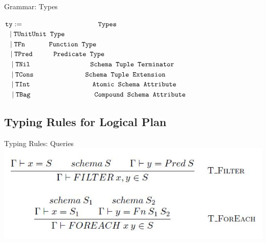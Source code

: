 \begin{frame}{Grammar: Types}
\centering
	\begin{flushleft}
	$ \texttt{ty} := \qquad\qquad\qquad\qquad\quad\quad\:\: \texttt{Types}\hfill$\\
	$ \:\:\: \mid \texttt{TUnit}\hfill \texttt{Unit Type}\hfill$\\
   	$ \:\:\: \mid \texttt{TFn} \hfill\qquad\quad\:\: \texttt{Function Type}\hfill$\\
    $ \:\:\: \mid \texttt{TPred} \hfill\qquad\quad \texttt{Predicate Type}\hfill$\\
    $ \:\:\: \mid \texttt{TNil} \hfill \qquad\qquad\qquad\qquad\:\:\: \texttt{Schema Tuple Terminator}\hfill$\\
    $ \:\:\: \mid \texttt{TCons} \hfill \qquad\qquad\qquad\quad\:\: \texttt{Schema Tuple Extension}\hfill$\\
   	$ \:\:\: \mid \texttt{TInt} \hfill \qquad\qquad\qquad\qquad\quad \texttt{Atomic Schema Attribute}\hfill$\\
    $ \:\:\: \mid \texttt{TBag} \hfill \quad\qquad\qquad\qquad\qquad\: \texttt{Compound Schema Attribute}\hfill$\\
	\end{flushleft}
\end{frame}

\subsection{Typing Rules for Logical Plan}
\begin{frame}{Typing Rules: Queries}
\centering
\includegraphics[scale=0.4]{Images/TypingRules/FilterForeach.JPG} 
\end{frame}

